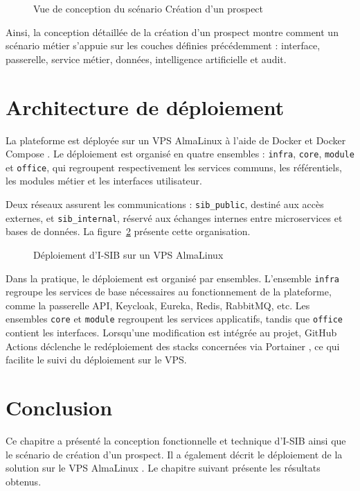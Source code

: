 \begin{figure}[H]
    \centering
    \caption{Vue de conception du scénario Création d'un prospect}
    \label{fig:conception_creation_prospect}
\end{figure}

\newpage
Ainsi, la conception détaillée de la création d'un prospect montre comment un
scénario métier s'appuie sur les couches définies précédemment : interface,
passerelle, service métier, données, intelligence artificielle et audit.

\section{Architecture de déploiement}

La plateforme est déployée sur un VPS AlmaLinux \cite{almalinux_official} à l’aide de Docker \cite{docker_docs} et Docker Compose \cite{docker_compose_docs}. Le déploiement est organisé en quatre ensembles : \texttt{infra}, \texttt{core}, \texttt{module} et \texttt{office}, qui regroupent respectivement les services communs, les référentiels, les modules métier et les interfaces utilisateur.

Deux réseaux assurent les communications : \texttt{sib\_public}, destiné aux accès externes, et \texttt{sib\_internal}, réservé aux échanges internes entre microservices et bases de données. La figure~\ref{fig:architecture_deploiement} présente cette organisation.
\begin{figure}[H]
    \centering
    \caption{Déploiement d'I-SIB sur un VPS AlmaLinux}
    \label{fig:architecture_deploiement}
\end{figure}
\newpage{}
Dans la pratique, le déploiement est organisé par ensembles. L'ensemble
\texttt{infra} regroupe les services de base nécessaires au fonctionnement de
la plateforme, comme la passerelle API, Keycloak, Eureka,
Redis, RabbitMQ, etc. Les ensembles \texttt{core} et \texttt{module} regroupent les
services applicatifs, tandis que \texttt{office} contient les interfaces. Lorsqu'une
modification est intégrée au projet, GitHub Actions \cite{github_actions_docs}
déclenche le redéploiement des stacks concernées via Portainer
\cite{portainer_docs}, ce qui facilite le suivi du déploiement sur le VPS.
\section*{Conclusion}
{}


Ce chapitre a présenté la conception fonctionnelle et technique d'I-SIB ainsi que le scénario de création d'un prospect. Il a également décrit le déploiement de la solution sur le VPS AlmaLinux \cite{almalinux_official}. Le chapitre suivant présente les résultats obtenus.


